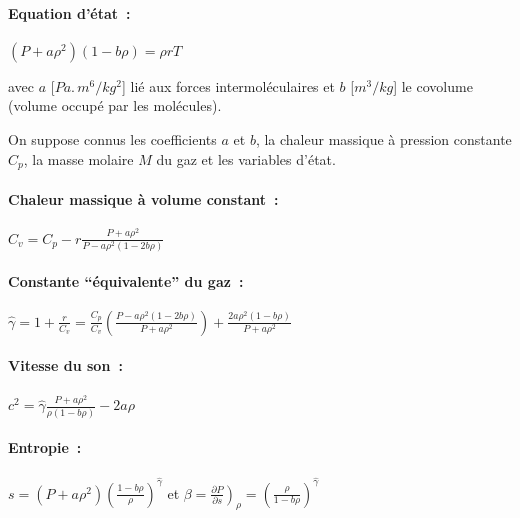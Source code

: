 \paragraph{Equation d'état~:}

$(P+a\rho^2)(1-b\rho) = \rho r T$

avec $a$ [$Pa.\,m^6 / kg^2$] lié aux forces intermoléculaires
et $b$ [$m^3/kg$] le covolume (volume occupé par les molécules).

On suppose connus les coefficients $a$ et $b$,
la chaleur massique à pression constante $C_p$,
la masse molaire $M$ du gaz et
les variables d'état.


\paragraph{Chaleur massique à volume constant~:}

$C_v = C_p - r
\displaystyle\frac{P+a\rho^2}{P-a\rho^2 (1-2b\rho)}$


\paragraph{Constante ``équivalente'' du gaz~:}

$\hat{\gamma} = 1 + \displaystyle\frac{r}{C_v}
= \displaystyle\frac{C_p}{C_v}
\displaystyle\left(\frac{P-a\rho^2 (1-2b\rho)}{P+a\rho^2}\right)
+ \displaystyle\frac{2a\rho^2 (1-b\rho)}{P+a\rho^2}$

\paragraph{Vitesse du son~:}

$c^2 = \hat{\gamma} \displaystyle\frac{P+a\rho^2}{\rho(1-b\rho)} - 2a\rho$


\paragraph{Entropie~:}

$s = (P+a\rho^2)
\left(\displaystyle\frac{1-b\rho}{\rho}\right)^{\hat{\gamma}}$
\quad et
$\beta = \left.\displaystyle\frac{\partial P}{\partial s}\right)_{\rho}
= \left(\displaystyle\frac{\rho}{1-b\rho}\right)^{\hat{\gamma}}$



